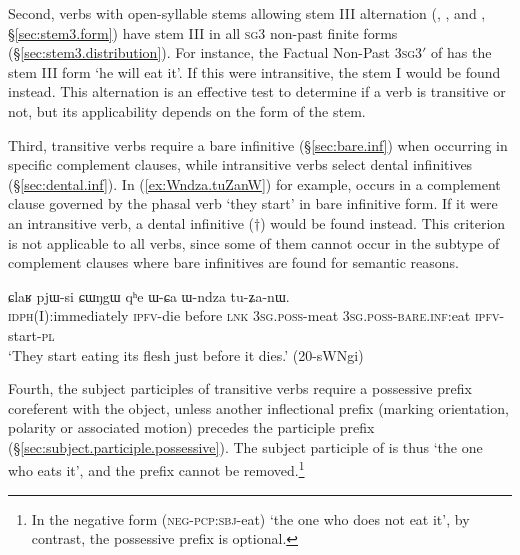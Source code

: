 Second, verbs with open-syllable stems allowing stem III alternation (, ,  and , §\ref{sec:stem3.form}) have stem III in all \textsc{sg}\fl{}3 non-past finite forms  (§\ref{sec:stem3.distribution}). For instance, the Factual Non-Past 3\textsc{sg}\fl{}3$'$ of  has the stem III form  `he will eat it'. If this were intransitive, the stem I  would be found instead. This alternation is an effective test to determine if a verb is transitive or not, but its applicability depends on the form of the stem.

Third, transitive verbs require a bare infinitive (§\ref{sec:bare.inf}) when occurring in specific complement clauses, while intransitive verbs select dental infinitives (§\ref{sec:dental.inf}). In (\ref{ex:Wndza.tuZanW}) for example,  occurs in a complement clause governed by the phasal verb  `they start' in bare infinitive form. If it were an intransitive verb, a dental infinitive ($\dagger$) would be found instead. This criterion is not applicable to all verbs, since some of them cannot occur in the subtype of complement clauses where bare infinitives are found for semantic reasons.

\begin{exe}
\ex   \label{ex:Wndza.tuZanW}
\gll  ɕlaʁ pjɯ-si ɕɯŋgɯ qʰe ɯ-ɕa ɯ-ndza tu-ʑa-nɯ. \\
\textsc{idph}(I):immediately \textsc{ipfv}-die before \textsc{lnk} \textsc{3sg}.\textsc{poss}-meat \textsc{3sg}.\textsc{poss}-\textsc{bare}.\textsc{inf}:eat \textsc{ipfv}-start-\textsc{pl} \\
\glt `They start eating its flesh just before it dies.' (20-sWNgi)
\end{exe}

Fourth, the subject participles of transitive verbs require a possessive prefix coreferent with the object, unless another inflectional prefix (marking orientation, polarity or associated motion) precedes the participle prefix   (§\ref{sec:subject.participle.possessive}). The subject participle of  is thus  `the one who eats it', and the prefix  cannot be removed.\footnote{In the negative form  (\textsc{neg}-\textsc{pcp}:\textsc{sbj}-eat) `the one who does not eat it', by contrast, the possessive prefix  is optional.}

